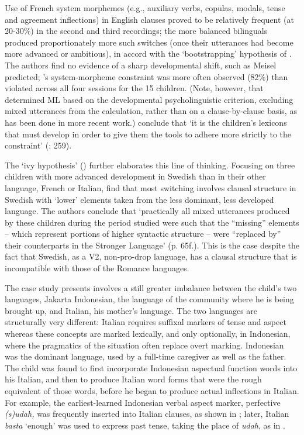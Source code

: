 \documentclass[output=paper]{langscibook}
\begin{document}
Use of French system morphemes (e.g., auxiliary verbs, copulas, modals, tense and agreement inflections) in English clauses proved to be relatively frequent (at 20-30\%) in the second and third recordings; the more balanced bilinguals produced proportionately more such switches (once their utterances had become more advanced or ambitious), in accord with the ‘bootstrapping’ hypothesis of \citet{Gawiltzek-MaiwaldTracy1996}. The authors find no evidence of a sharp developmental shift, such as Meisel predicted; \citeauthor{Myers-Scotton1993duelling}’s system-morpheme constraint was more often observed (82\%) than violated across all four sessions for the 15 children. (Note, however, that \citeauthor{ParadisEtAl2000} determined ML based on the developmental psycholinguistic criterion, excluding mixed utterances from the calculation, rather than on a clause-by-clause basis, as has been done in more recent work.) \citeauthor{ParadisEtAl2000} conclude that ‘it is the children’s lexicons that must develop in order to give them the tools to adhere more strictly to the constraint’ (\citeyear{ParadisEtAl2000}: 259).

The ‘ivy hypothesis’ (\citealt{BernardiniSchlyter2004}) further elaborates this line of thinking. Focusing on three children with more advanced development in Swedish than in their other language, French or Italian, \citet{BernardiniSchlyter2004} find that most switching involves clausal structure in Swedish with ‘lower’ elements taken from the less dominant, less developed language. The authors conclude that ‘practically all mixed utterances produced by these children during the period studied were such that the “missing” elements – which represent portions of higher syntactic structure – were “replaced by” their counterparts in the Stronger Language’ (p. 65f.). This is the case despite the fact that Swedish, as a V2, non-pro-drop language, has a clausal structure that is incompatible with those of the Romance languages.

The case study \citet{Soriente2014} presents involves a still greater imbalance between the child’s two languages, Jakarta Indonesian, the language of the community where he is being brought up, and Italian, his mother’s language. The two languages are structurally very different: Italian requires suffixal markers of tense and aspect whereas these concepts are marked lexically, and only optionally, in Indonesian, where the pragmatics of the situation often replace overt marking. Indonesian was the dominant language, used by a full-time caregiver as well as the father. The child was found to first incorporate Indonesian aspectual function words into his Italian, and then to produce Italian word forms that were the rough equivalent of those words, before he began to produce actual inflections in Italian. For example, the earliest-learned Indonesian verbal aspect marker, perfective \textit{(s)udah,} was frequently inserted into Italian clauses, as shown in ; later, Italian \textit{basta} ‘enough’ was used to express past tense, taking the place of \textit{udah}, as in .
\end{document}
